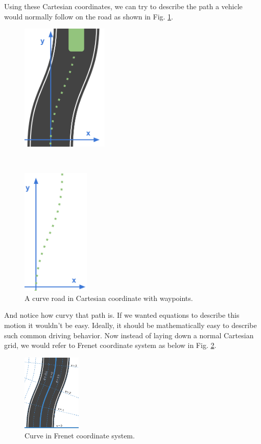 Using these Cartesian coordinates, we can try to describe the path a vehicle would normally follow on the road as shown in Fig. \ref{fig:curve-in-cartesian-wp}.

\begin{figure}[h]
  \centering
    \begin{minipage}{.5\textwidth}
        \centering
        \includegraphics[height=2.4in]{figs/ch3/curve-in-cartesian-with-waypoints}
    \end{minipage}
    ~
    \begin{minipage}{.5\textwidth}
       \centering
      \includegraphics[height=2.4in]{figs/ch3/waypoints-in-cartesian}
     \end{minipage}
\caption{A curve road in Cartesian coordinate with waypoints.}
\label{fig:curve-in-cartesian-wp}
\end{figure}

And notice how curvy that path is. If we wanted equations to describe this motion it wouldn't be easy. Ideally, it should be mathematically easy to describe such common driving behavior. Now instead of laying down a normal Cartesian grid, we would refer to Frenet coordinate system as below in Fig. \ref{fig:curve-in-frenet}.

\begin{figure}[h]
\centering
\includegraphics[width=0.25\textwidth]{figs/ch3/curve-in-frenet}
\caption{Curve in Frenet coordinate system.}
\label{fig:curve-in-frenet}
\end{figure}

